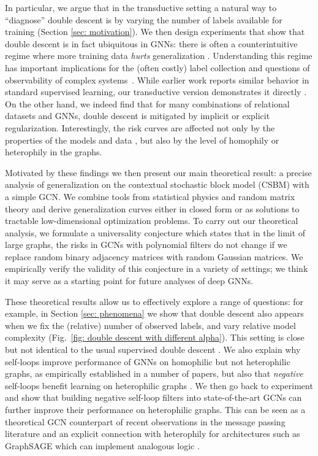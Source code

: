 \documentclass[9pt,twocolumn]{pnas-new}
\begin{document}
In particular, we argue that in the transductive setting a natural way to ``diagnose'' double descent is by varying the number of labels available for training (Section \ref{sec: motivation}). We then design experiments that show that double descent is in fact ubiquitous in GNNs: there is often a counterintuitive regime where more training data \emph{hurts} generalization \cite{nakkiran2021deep}. Understanding this regime has important implications for the (often costly) label collection and questions of observability of complex systems~\cite{liu2013observability}. While earlier work reports similar behavior in standard supervised learning, our transductive version demonstrates it directly \cite{nakkiran2021deep,chen2021multiple}. On the other hand, we indeed find that for many combinations of relational datasets and GNNs, double descent is mitigated by implicit or explicit regularization. Interestingly, the risk curves are affected not only by the properties of the models and data \cite{nakkiran2021deep}, but also by the level of homophily or heterophily in the graphs.

Motivated by these findings we then present our main theoretical result: a precise analysis of generalization on the contextual stochastic block model (CSBM) with a simple GCN. We combine tools from statistical physics and random matrix theory and derive generalization curves either in closed form or as solutions to tractable low-dimensional optimization problems. To carry out our theoretical analysis, we formulate a universality conjecture which states that in the limit of large graphs, the risks in GCNs with polynomial filters do not change if we replace random binary adjacency matrices with random Gaussian matrices. We empirically verify the validity of this conjecture in a variety of settings; we think it may serve as a starting point for future analyses of deep GNNs.


These theoretical results allow us to effectively explore a range of questions: for example, in Section \ref{sec: phenomena} we show that double descent also appears when we fix the (relative) number of observed labels, and vary relative model complexity (Fig.~\ref{fig: double descent with different alpha}). This setting is close but not identical to the usual supervised double descent \cite{belkin2020two}. We also explain why self-loops improve performance of GNNs on homophilic \cite{mcpherson2001birds} but not heterophilic \cite{pei2020geom,chien2021adaptive} graphs, as empirically established in a number of papers, but also that \emph{negative} self-loops benefit learning on heterophilic graphs \cite{wei2022understanding,baranwal2023optimality}. We then go back to experiment and show that building negative self-loop filters into state-of-the-art GCNs can further improve their performance on heterophilic graphs. This can be seen as a theoretical GCN counterpart of recent observations in the message passing literature \cite{wei2022understanding,baranwal2023optimality} and an explicit connection with heterophily for architectures such as GraphSAGE which can implement analogous logic \cite{hamilton2017inductive}.
\end{document}
